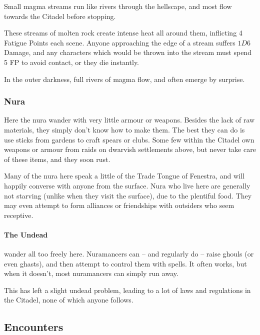 \begin{multicols}{2}
Small magma streams run like rivers through the hellscape, and most flow towards the Citadel before stopping.

These streams of molten rock create intense heat all around them, inflicting 4 Fatigue Points each scene.
Anyone approaching the edge of a stream suffers $1D6$ Damage, and any characters which would be thrown into the stream must spend 5 FP to avoid contact, or they die instantly.

In the outer darkness, full rivers of magma flow, and often emerge by surprise.

\subsubsection{Nura}

Here the nura wander with very little armour or weapons.
Besides the lack of raw materials, they simply don't know how to make them.
The best they can do is use sticks from gardens to craft spears or clubs.
Some few within the Citadel own weapons or armour from raids on dwarvish settlements above, but never take care of these items, and they soon rust.

Many of the nura here speak a little of the Trade Tongue of Fenestra, and will happily converse with anyone from the surface.
Nura who live here are generally not starving (unlike when they visit the surface), due to the plentiful food.
They may even attempt to form alliances or friendships with outsiders who seem receptive.

\encNura
{}

\paragraph{The Undead}
wander all too freely here.
Nuramancers can -- and regularly do -- raise ghouls (or even ghasts), and then attempt to control them with spells.
It often works, but when it doesn't, most nuramancers can simply run away.

This has left a slight undead problem, leading to a lot of laws and regulations in the Citadel, none of which anyone follows.


\subsection{Encounters}


\end{multicols}
